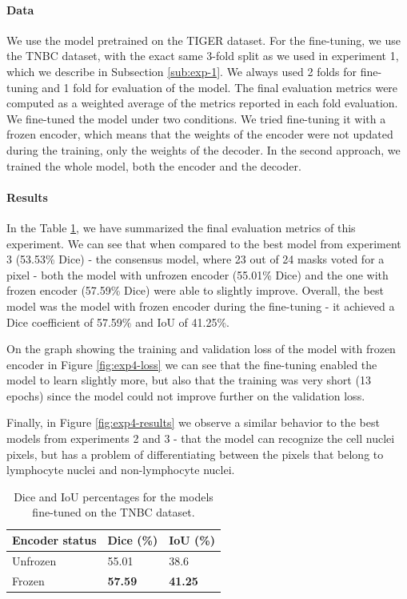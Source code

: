 \paragraph{Data}
We use the model pretrained on the TIGER dataset. For the fine-tuning, we use the TNBC dataset, with the exact same 3-fold split as we used in experiment 1, which we describe in Subsection \ref{sub:exp-1}. We always used 2 folds for fine-tuning and 1 fold for evaluation of the model. The final evaluation metrics were computed as a weighted average of the metrics reported in each fold evaluation. We fine-tuned the model under two conditions. We tried fine-tuning it with a frozen encoder, which means that the weights of the encoder were not updated during the training, only the weights of the decoder. In the second approach, we trained the whole model, both the encoder and the decoder.

\paragraph{Results}
In the Table \ref{tab:transfer}, we have summarized the final evaluation metrics of this experiment. We can see that when compared to the best model from experiment 3 (53.53\% Dice) - the consensus model, where 23 out of 24 masks voted for a pixel - both the model with unfrozen encoder (55.01\% Dice) and the one with frozen encoder (57.59\% Dice) were able to slightly improve. Overall, the best model was the model with frozen encoder during the fine-tuning - it achieved a Dice coefficient of 57.59\% and IoU of 41.25\%.

On the graph showing the training and validation loss of the model with frozen encoder in Figure \ref{fig:exp4-loss} we can see that the fine-tuning enabled the model to learn slightly more, but also that the training was very short (13 epochs) since the model could not improve further on the validation loss.

Finally, in Figure \ref{fig:exp4-results} we observe a similar behavior to the best models from experiments 2 and 3 - that the model can recognize the cell nuclei pixels, but has a problem of differentiating between the pixels that belong to lymphocyte nuclei and non-lymphocyte nuclei.

\begin{table}[H]
  \centering
  \begin{tabular}{ p{5cm} | p{3cm} | p{3cm} } 
    \hline
    \textbf{Encoder status} & \textbf{Dice (\%)} & \textbf{IoU (\%)} \\
    \hline
      Unfrozen & 55.01 & 38.6 \\
      Frozen   & \textbf{57.59} & \textbf{41.25} \\
    \hline
  \end{tabular}
  \caption{Dice and IoU percentages for the models fine-tuned on the TNBC dataset.}
  \label{tab:transfer}
\end{table}

